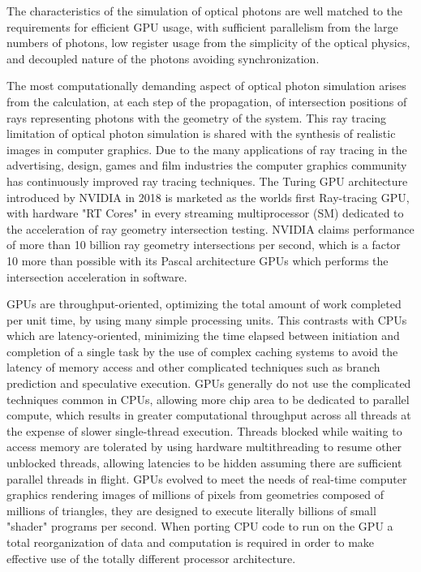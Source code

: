\documentclass{webofc}
\begin{document}
The characteristics of the simulation of optical photons are well matched to 
the requirements for efficient GPU usage, with sufficient parallelism from 
the large numbers of photons, low register usage from the simplicity of 
the optical physics, and decoupled nature of the photons avoiding synchronization.

The most computationally demanding aspect of optical photon simulation 
arises from the calculation, at each step of the propagation, 
of intersection positions of rays representing photons with the geometry of the system.
This ray tracing limitation of optical photon simulation is shared 
with the synthesis of realistic images in computer graphics. Due to the many applications
of ray tracing in the advertising, design, games and film industries the computer graphics
community has continuously improved ray tracing techniques. The Turing GPU architecture 
introduced by NVIDIA in 2018 is marketed as the worlds first Ray-tracing GPU, with   
hardware "RT Cores" in every streaming multiprocessor (SM) dedicated to the 
acceleration of ray geometry intersection testing.
NVIDIA claims performance of more than 10 billion ray geometry intersections 
per second, which is a factor 10 more than possible with its Pascal architecture GPUs
which performs the intersection acceleration in software. 

GPUs are throughput-oriented\cite{throughput}, optimizing the total amount of work completed per unit time,
by using many simple processing units. This contrasts with CPUs which are latency-oriented, 
minimizing the time elapsed between initiation and completion of a single task by the use of complex
caching systems to avoid the latency of memory access and other complicated techniques such as branch prediction 
and speculative execution. GPUs generally do not use the complicated techniques common in CPUs, 
allowing more chip area to be dedicated to parallel compute, which results in greater computational throughput across 
all threads at the expense of slower single-thread execution.
Threads blocked while waiting to access memory are tolerated by using 
hardware multithreading to resume other unblocked threads, allowing latencies to be hidden assuming 
there are sufficient parallel threads in flight. 
GPUs evolved to meet the needs of real-time computer graphics rendering images of millions of pixels from geometries
composed of millions of triangles, they are designed to execute literally billions of small "shader" 
programs per second. When porting CPU code to run on the GPU a total reorganization of 
data and computation is required in order to make effective use of the totally different processor 
architecture.
%
\end{document}
